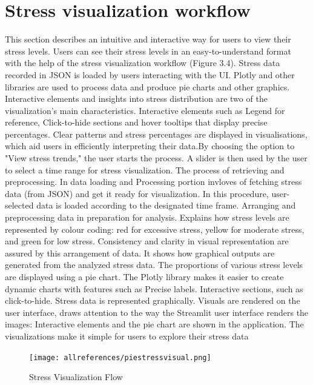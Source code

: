 \documentclass[Arial,12pt,openright,twoside]{book}
\begin{document}
\section{Stress visualization workflow}
This section describes an intuitive and interactive way for users to view their stress levels. Users can see their stress levels in an easy-to-understand format with the help of the stress visualization workflow (Figure 3.4). Stress data recorded in JSON is loaded by users interacting with the UI. Plotly and other libraries are used to process data and produce pie charts and other graphics. Interactive elements and insights into stress distribution are two of the visualization's main characteristics. Interactive elements such as Legend for reference, Click-to-hide sections and hover tooltips that display precise percentages. Clear patterns and stress percentages are displayed in visualisations, which aid users in efficiently interpreting their data.By choosing the option to "View stress trends," the user starts the process. A slider is then used by the user to select a time range for stress visualization. The process of retrieving and preprocessing. In data loading and Processing portion invloves of fetching stress data (from JSON) and get it ready for visualization. In this procedure, user-selected data is loaded according to the designated time frame. Arranging and preprocessing data in preparation for analysis. Explains how stress levels are represented by colour coding: red for excessive stress, yellow for moderate stress, and green for low stress. Consistency and clarity in visual representation are assured by this arrangement of data. It shows how graphical outputs are generated from the analyzed stress data. The proportions of various stress levels are displayed using a pie chart. The Plotly library makes it easier to create dynamic charts with features such as Precise labels. Interactive sections, such as click-to-hide. Stress data is represented graphically. Visuals are rendered on the user interface, draws attention to the way the Streamlit user interface renders the images: Interactive elements and the pie chart are shown in the application. The visualizations make it simple for users to explore their stress data
\vspace{10pt} %
\FloatBarrier
\begin{figure}[H]
    \centering
    \texttt{[image: allreferences/piestressvisual.png]}
    \caption{Stress Visualization Flow}
    \label{fig:system_architecture}
\end{figure}
\end{document}
